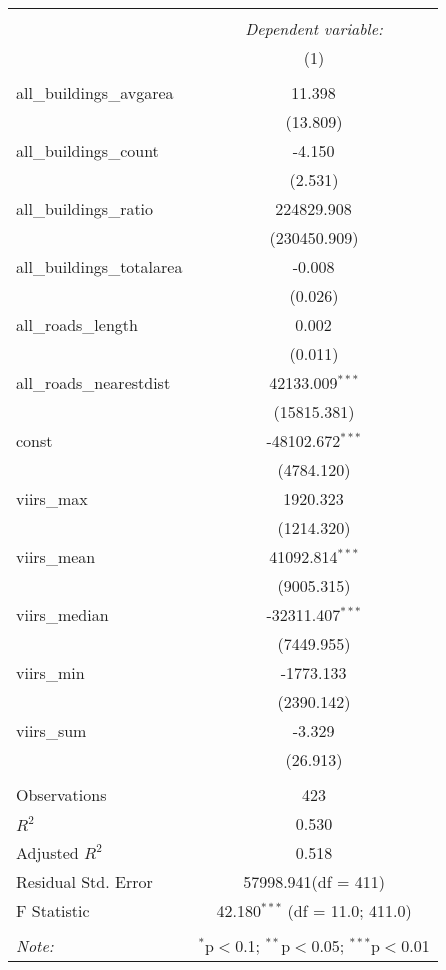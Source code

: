 \begin{table}[!htbp] \centering
\begin{tabular}{@{\extracolsep{5pt}}lc}
\\[-1.8ex]\hline
\hline \\[-1.8ex]
& \multicolumn{1}{c}{\textit{Dependent variable:}} \
\cr \cline{1-2}
\\[-1.8ex] & (1) \\
\hline \\[-1.8ex]
 all_buildings_avgarea & 11.398$^{}$ \\
  & (13.809) \\
 all_buildings_count & -4.150$^{}$ \\
  & (2.531) \\
 all_buildings_ratio & 224829.908$^{}$ \\
  & (230450.909) \\
 all_buildings_totalarea & -0.008$^{}$ \\
  & (0.026) \\
 all_roads_length & 0.002$^{}$ \\
  & (0.011) \\
 all_roads_nearestdist & 42133.009$^{***}$ \\
  & (15815.381) \\
 const & -48102.672$^{***}$ \\
  & (4784.120) \\
 viirs_max & 1920.323$^{}$ \\
  & (1214.320) \\
 viirs_mean & 41092.814$^{***}$ \\
  & (9005.315) \\
 viirs_median & -32311.407$^{***}$ \\
  & (7449.955) \\
 viirs_min & -1773.133$^{}$ \\
  & (2390.142) \\
 viirs_sum & -3.329$^{}$ \\
  & (26.913) \\
\hline \\[-1.8ex]
 Observations & 423 \\
 $R^2$ & 0.530 \\
 Adjusted $R^2$ & 0.518 \\
 Residual Std. Error & 57998.941(df = 411)  \\
 F Statistic & 42.180$^{***}$ (df = 11.0; 411.0) \\
\hline
\hline \\[-1.8ex]
\textit{Note:} & \multicolumn{1}{r}{$^{*}$p$<$0.1; $^{**}$p$<$0.05; $^{***}$p$<$0.01} \\
\end{tabular}
\end{table}